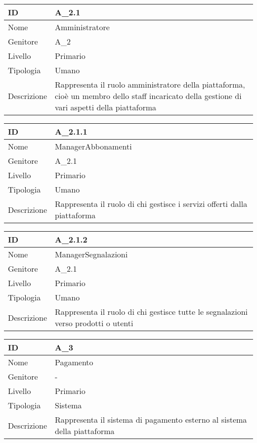 \begin{center}
\begin{tabular}{ |p{2cm}|p{10cm}|  }
\hline
ID & A\_2.1 \\\hline
Nome & Amministratore\\\hline
Genitore & A\_2\\\hline
Livello &  Primario \\\hline
Tipologia & Umano \\\hline
Descrizione &  Rappresenta il ruolo amministratore della piattaforma, cioè un membro dello staff incaricato della gestione di vari aspetti della piattaforma \\\hline
\end{tabular}
\label{table_attore:2.1}\newline

\begin{tabular}{ |p{2cm}|p{10cm}|  }
\hline
ID & A\_2.1.1 \\\hline
Nome & ManagerAbbonamenti\\\hline
Genitore & A\_2.1\\\hline
Livello &  Primario \\\hline
Tipologia & Umano \\\hline
Descrizione &  Rappresenta il ruolo di chi gestisce i servizi offerti dalla piattaforma \\\hline
\end{tabular}
\label{table_attore:2.1.1}\newline

\begin{tabular}{ |p{2cm}|p{10cm}|  }
\hline
ID & A\_2.1.2 \\\hline
Nome & ManagerSegnalazioni\\\hline
Genitore & A\_2.1\\\hline
Livello &  Primario \\\hline
Tipologia & Umano \\\hline
Descrizione &  Rappresenta il ruolo di chi gestisce tutte le segnalazioni verso prodotti o utenti \\\hline
\end{tabular}
\label{table_attore:2.1.2}\newline

\begin{tabular}{ |p{2cm}|p{10cm}|  }
\hline
ID & A\_3 \\\hline
Nome & Pagamento\\\hline
Genitore & - \\\hline
Livello &  Primario \\\hline
Tipologia & Sistema \\\hline
Descrizione &  Rappresenta il sistema di pagamento esterno al sistema della piattaforma \\\hline
\end{tabular}
\label{table_attore:3}\newline


\end{center}
